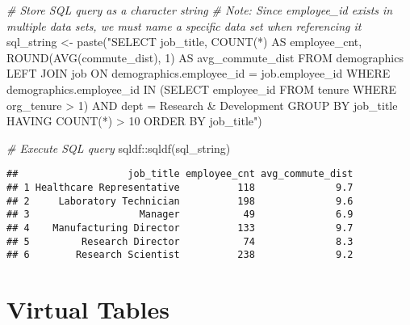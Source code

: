 \documentclass[
]{book}
\newenvironment{Shaded}{\begin{snugshade}}{\end{snugshade}}
\newcommand{\CommentTok}[1]{\textcolor[rgb]{0.56,0.35,0.01}{\textit{#1}}}
\newcommand{\FunctionTok}[1]{\textcolor[rgb]{0.00,0.00,0.00}{#1}}
\newcommand{\NormalTok}[1]{#1}
\newcommand{\OtherTok}[1]{\textcolor[rgb]{0.56,0.35,0.01}{#1}}
\newcommand{\SpecialCharTok}[1]{\textcolor[rgb]{0.00,0.00,0.00}{#1}}
\newcommand{\StringTok}[1]{\textcolor[rgb]{0.31,0.60,0.02}{#1}}
\begin{document}
\begin{Shaded}
\begin{Highlighting}[]
\CommentTok{\# Store SQL query as a character string}
\CommentTok{\# Note: Since employee\_id exists in multiple data sets, we must name a specific data set when referencing it}
\NormalTok{sql\_string }\OtherTok{\textless{}{-}} \FunctionTok{paste}\NormalTok{(}\StringTok{"SELECT}
\StringTok{                      job\_title,}
\StringTok{                      COUNT(*) AS employee\_cnt,}
\StringTok{                      ROUND(AVG(commute\_dist), 1) AS avg\_commute\_dist}
\StringTok{                    FROM}
\StringTok{                        demographics}
\StringTok{                      LEFT JOIN}
\StringTok{                        job}
\StringTok{                      ON}
\StringTok{                        demographics.employee\_id = job.employee\_id}
\StringTok{                    WHERE}
\StringTok{                        demographics.employee\_id IN (SELECT employee\_id FROM tenure WHERE org\_tenure \textgreater{} 1)}
\StringTok{                      AND }
\StringTok{                        dept = \textquotesingle{}Research \& Development\textquotesingle{}}
\StringTok{                    GROUP BY}
\StringTok{                      job\_title}
\StringTok{                    HAVING}
\StringTok{                      COUNT(*) \textgreater{} 10}
\StringTok{                    ORDER BY}
\StringTok{                      job\_title"}\NormalTok{)}

\CommentTok{\# Execute SQL query}
\NormalTok{sqldf}\SpecialCharTok{::}\FunctionTok{sqldf}\NormalTok{(sql\_string)}
\end{Highlighting}
\end{Shaded}

\begin{verbatim}
##                   job_title employee_cnt avg_commute_dist
## 1 Healthcare Representative          118              9.7
## 2     Laboratory Technician          198              9.6
## 3                   Manager           49              6.9
## 4    Manufacturing Director          133              9.7
## 5         Research Director           74              8.3
## 6        Research Scientist          238              9.2
\end{verbatim}

\hypertarget{virtual-tables}{%
\section{Virtual Tables}\label{virtual-tables}}
\end{document}
